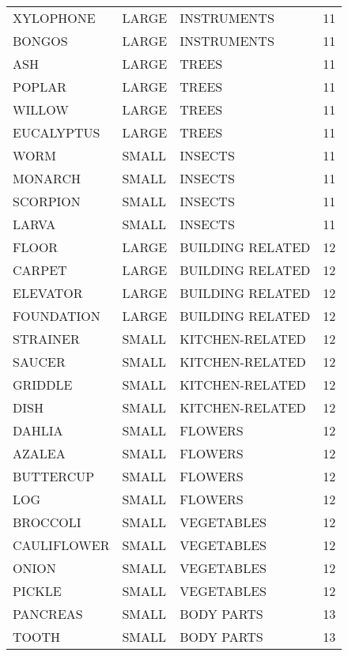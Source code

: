\begin{tabular}{lllr}
   XYLOPHONE & LARGE &      INSTRUMENTS &       11 \\
      BONGOS & LARGE &      INSTRUMENTS &       11 \\
         ASH & LARGE &            TREES &       11 \\
      POPLAR & LARGE &            TREES &       11 \\
      WILLOW & LARGE &            TREES &       11 \\
  EUCALYPTUS & LARGE &            TREES &       11 \\
        WORM & SMALL &          INSECTS &       11 \\
     MONARCH & SMALL &          INSECTS &       11 \\
    SCORPION & SMALL &          INSECTS &       11 \\
       LARVA & SMALL &          INSECTS &       11 \\
       FLOOR & LARGE & BUILDING RELATED &       12 \\
      CARPET & LARGE & BUILDING RELATED &       12 \\
    ELEVATOR & LARGE & BUILDING RELATED &       12 \\
  FOUNDATION & LARGE & BUILDING RELATED &       12 \\
    STRAINER & SMALL &  KITCHEN-RELATED &       12 \\
      SAUCER & SMALL &  KITCHEN-RELATED &       12 \\
     GRIDDLE & SMALL &  KITCHEN-RELATED &       12 \\
        DISH & SMALL &  KITCHEN-RELATED &       12 \\
      DAHLIA & SMALL &          FLOWERS &       12 \\
      AZALEA & SMALL &          FLOWERS &       12 \\
   BUTTERCUP & SMALL &          FLOWERS &       12 \\
         LOG & SMALL &          FLOWERS &       12 \\
    BROCCOLI & SMALL &       VEGETABLES &       12 \\
 CAULIFLOWER & SMALL &       VEGETABLES &       12 \\
       ONION & SMALL &       VEGETABLES &       12 \\
      PICKLE & SMALL &       VEGETABLES &       12 \\
    PANCREAS & SMALL &       BODY PARTS &       13 \\
       TOOTH & SMALL &       BODY PARTS &       13 \\

\end{tabular}
